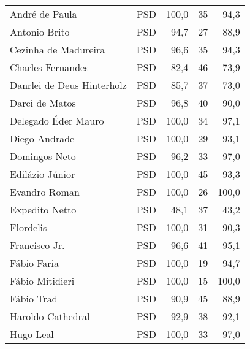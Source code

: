 \begin{longtable}{llrrr}
                      André de Paula &            PSD &     100,0 &           35 &       94,3 \\
                       Antonio Brito &            PSD &      94,7 &           27 &       88,9 \\
                Cezinha de Madureira &            PSD &      96,6 &           35 &       94,3 \\
                   Charles Fernandes &            PSD &      82,4 &           46 &       73,9 \\
          Danrlei de Deus Hinterholz &            PSD &      85,7 &           37 &       73,0 \\
                      Darci de Matos &            PSD &      96,8 &           40 &       90,0 \\
                 Delegado Éder Mauro &            PSD &     100,0 &           34 &       97,1 \\
                       Diego Andrade &            PSD &     100,0 &           29 &       93,1 \\
                       Domingos Neto &            PSD &      96,2 &           33 &       97,0 \\
                     Edilázio Júnior &            PSD &     100,0 &           45 &       93,3 \\
                       Evandro Roman &            PSD &     100,0 &           26 &      100,0 \\
                      Expedito Netto &            PSD &      48,1 &           37 &       43,2 \\
                           Flordelis &            PSD &     100,0 &           31 &       90,3 \\
                       Francisco Jr. &            PSD &      96,6 &           41 &       95,1 \\
                         Fábio Faria &            PSD &     100,0 &           19 &       94,7 \\
                     Fábio Mitidieri &            PSD &     100,0 &           15 &      100,0 \\
                          Fábio Trad &            PSD &      90,9 &           45 &       88,9 \\
                   Haroldo Cathedral &            PSD &      92,9 &           38 &       92,1 \\
                           Hugo Leal &            PSD &     100,0 &           33 &       97,0 \\

\end{longtable}
